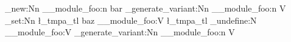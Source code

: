 \cs_new:Nn
  \__module_foo:n
  { bar }
\cs_generate_variant:Nn
  \__module_foo:n
  { V }
\tl_set:Nn
  \l_tmpa_tl
  { baz }
\__module_foo:V
  \l_tmpa_tl
\cs_undefine:N
  \__module_foo:V
\cs_generate_variant:Nn  %
  \__module_foo:n
  { V }
